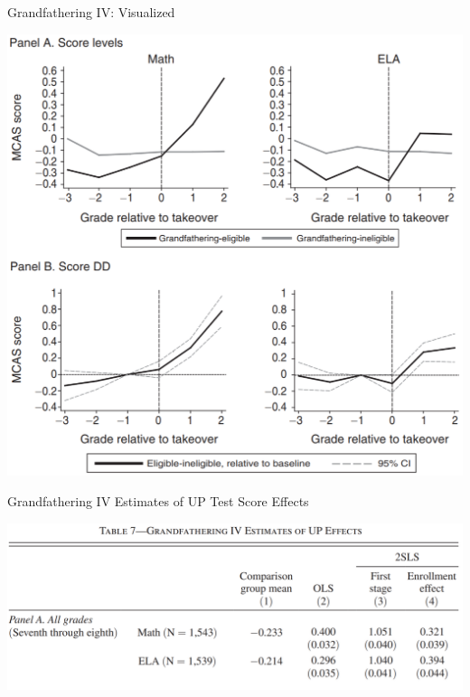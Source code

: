 \documentclass{beamer}
\begin{document}
\begin{frame}{Grandfathering IV: Visualized}

\vspace{-0.2cm}
\begin{center}
\includegraphics[scale=0.29]{./lecture_includes/charters2.png}
\end{center}

\end{frame}

\begin{frame}{Grandfathering IV Estimates of UP Test Score Effects}

\begin{center}
\includegraphics[scale=0.25]{./lecture_includes/charters3.png}
\end{center}

\end{frame}
\end{document}
